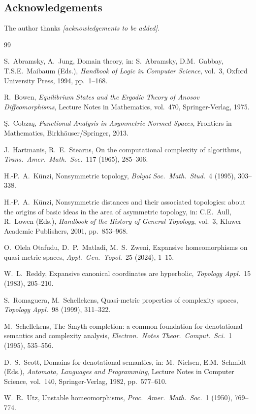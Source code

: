 \documentclass[11pt,a4paper]{article}
\theoremstyle{plain}
\theoremstyle{definition}
\begin{document}
\subsection*{Acknowledgements}

The author thanks \textit{[acknowledgements to be added]}.


\begin{thebibliography}{99}

 S.~Abramsky, A.~Jung, Domain theory, in:
  S.~Abramsky, D.M.~Gabbay, T.S.E.~Maibaum (Eds.),
  \textit{Handbook of Logic in Computer Science}, vol.~3, Oxford
  University Press, 1994, pp.~1--168.

 R.~Bowen, \textit{Equilibrium States and the
  Ergodic Theory of Anosov Diffeomorphisms}, Lecture Notes in
  Mathematics, vol.~470, Springer-Verlag, 1975.

 \c{S}.~Cobza\c{s}, \textit{Functional Analysis
  in Asymmetric Normed Spaces}, Frontiers in Mathematics,
  Birkh\"auser/Springer, 2013.

 J.~Hartmanis, R.~E.~Stearns, On the
  computational complexity of algorithms, \textit{Trans.\ Amer.\
  Math.\ Soc.}\ 117 (1965), 285--306.

 H.-P.~A.~K\"unzi, Nonsymmetric topology,
  \textit{Bolyai Soc.\ Math.\ Stud.}\ 4 (1995), 303--338.

 H.-P.~A.~K\"unzi, Nonsymmetric distances and
  their associated topologies: about the origins of basic ideas in
  the area of asymmetric topology, in: C.E.~Aull, R.~Lowen (Eds.),
  \textit{Handbook of the History of General Topology}, vol.~3,
  Kluwer Academic Publishers, 2001, pp.~853--968.

 O.~Olela Otafudu, D.~P.~Matladi, M.~S.~Zweni,
  Expansive homeomorphisms on quasi-metric spaces, \textit{Appl.\
  Gen.\ Topol.}\ 25 (2024), 1--15.

 W.~L.~Reddy, Expansive canonical coordinates
  are hyperbolic, \textit{Topology Appl.}\ 15 (1983), 205--210.

\bibitem{romaguera1999} S.~Romaguera, M.~Schellekens, Quasi-metric
  properties of complexity spaces, \textit{Topology Appl.}\ 98
  (1999), 311--322.

 M.~Schellekens, The Smyth completion: a
  common foundation for denotational semantics and complexity
  analysis, \textit{Electron.\ Notes Theor.\ Comput.\ Sci.}\ 1
  (1995), 535--556.

 D.~S.~Scott, Domains for denotational semantics,
  in: M.~Nielsen, E.M.~Schmidt (Eds.), \textit{Automata, Languages
  and Programming}, Lecture Notes in Computer Science, vol.~140,
  Springer-Verlag, 1982, pp.~577--610.

 W.~R.~Utz, Unstable homeomorphisms, \textit{Proc.\
  Amer.\ Math.\ Soc.}\ 1 (1950), 769--774.

\end{thebibliography}
\end{document}

